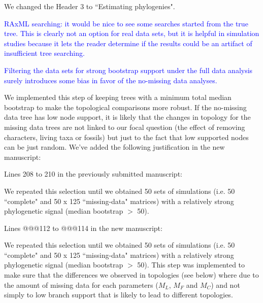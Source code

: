 \documentclass[11pt]{letter}
\begin{document}
\begin{letter}{}
We changed the Header 3 to ``Estimating phylogenies".


\textcolor{blue}{RAxML searching: it would be nice to see some searches started from the true tree. This is clearly not an option for real data sets, but it is helpful in simulation studies because it lets the reader determine if the results could be an artifact of insufficient tree searching.}



\textcolor{blue}{Filtering the data sets for strong bootstrap support under the full data analysis surely introduces some bias in favor of the no-missing data analyses.}

We implemented this step of keeping trees with a minimum total median bootstrap to make the topological comparisons more robust. If the no-missing data tree has low node support, it is likely that the changes in topology for the missing data trees are not linked to our focal question (the effect of removing characters, living taxa or fossils) but just to the fact that low supported nodes can be just random. We've added the following justification in the new manuscript:

Lines 208 to 210 in the previously submitted manuscript:

\hfill\begin{minipage}{\dimexpr\textwidth-1cm}
We repeated this selection until we obtained 50 sets of simulations (i.e. 50 ``complete" and 50 x 125 ``missing-data" matrices) with a relatively strong phylogenetic signal (median bootstrap $>$ 50).
\end{minipage}

Lines @@@112 to @@@114 in the new manuscript:

\hfill\begin{minipage}{\dimexpr\textwidth-1cm}
We repeated this selection until we obtained 50 sets of simulations (i.e. 50 ``complete" and 50 x 125 ``missing-data" matrices) with a relatively strong phylogenetic signal (median bootstrap $>$ 50). This step was implemented to make sure that the differences we observed in topologies (see below) where due to the amount of missing data for each parameters ($M_L$, $M_F$ and $M_C$) and not simply to low branch support that is likely to lead to different topologies.
\end{minipage}


\end{letter}
\end{document}
